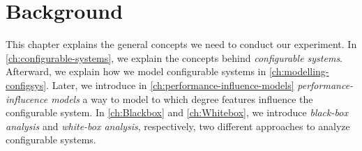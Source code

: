 \chapter{Background}\label{ch:background}
This chapter explains the general concepts we need to conduct our experiment.
In \autoref{ch:configurable-systems}, we explain the concepts behind \emph{configurable systems}.
Afterward, we explain how we model configurable systems in \autoref{ch:modelling-configsys}. 
Later, we introduce in \autoref{ch:performance-influence-models} \emph{performance-influcence models} 
a way to model to which degree features influence the configurable system.
In \autoref{ch:Blackbox} and \autoref{ch:Whitebox}, we introduce \emph{black-box analysis} and \emph{white-box analysis}, respectively, 
two different approaches to analyze configurable systems.





